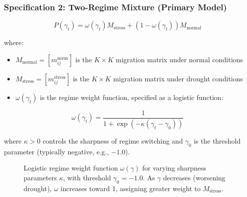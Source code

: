 \documentclass[12pt,a4paper]{article}
\newcommand{\Mnormal}{M_{\text{normal}}}
\newcommand{\Mstress}{M_{\text{stress}}}
\begin{document}
\subsubsection{Specification 2: Two-Regime Mixture (Primary Model)}

\begin{equation}
\label{eq:two_regime}
P(\gamma_t) = \omega(\gamma_t) \Mstress + (1 - \omega(\gamma_t)) \Mnormal
\end{equation}

where:
\begin{itemize}[noitemsep]
    \item $\Mnormal = [m_{ij}^{\text{norm}}]$ is the $K \times K$ migration matrix under normal conditions
    \item $\Mstress = [m_{ij}^{\text{stress}}]$ is the $K \times K$ migration matrix under drought conditions
    \item $\omega(\gamma_t)$ is the regime weight function, specified as a logistic function:
\end{itemize}

\begin{equation}
\label{eq:omega}
\omega(\gamma_t) = \frac{1}{1 + \exp(-\kappa (\gamma_t - \gamma_0))}
\end{equation}

where $\kappa > 0$ controls the sharpness of regime switching and $\gamma_0$ is the threshold parameter (typically negative, e.g., $-1.0$).

\begin{figure}[H]
\centering
{}
\caption{Logistic regime weight function $\omega(\gamma)$ for varying sharpness parameters $\kappa$, with threshold $\gamma_0 = -1.0$. As $\gamma$ decreases (worsening drought), $\omega$ increases toward 1, assigning greater weight to $M_{\text{stress}}$.}
\label{fig:regime_weight}
\end{figure}
\end{document}
